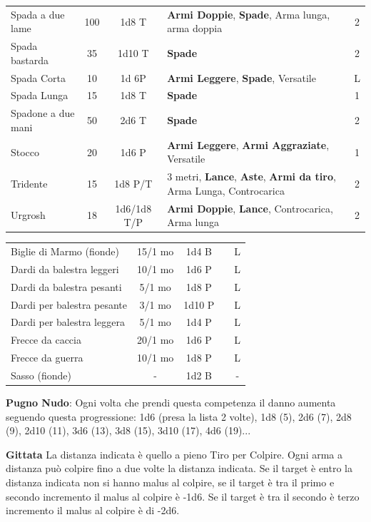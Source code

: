 \documentclass[a4paper,11pt,twoside,openany]{book}
\begin{document}
\begin{tabularx}{0.95\textwidth}{lccXc}
	Spada a due lame& 100& 1d8 T& \textbf{Armi Doppie}, \textbf{Spade}, Arma lunga, arma doppia& 2\\
	Spada bastarda& 35 & 1d10 T&\textbf{Spade}& 2\\
	Spada Corta& 10 & 1d 6P&\textbf{Armi Leggere}, \textbf{Spade}, Versatile& L\\
	Spada Lunga& 15 & 1d8 T&\textbf{Spade}& 1\\
	Spadone a due mani& 50 & 2d6 T&\textbf{Spade}& 2\\
	Stocco& 20 & 1d6 P& \textbf{Armi Leggere}, \textbf{Armi Aggraziate}, Versatile& 1\\
	Tridente& 15 & 1d8 P/T& 3 metri, \textbf{Lance}, \textbf{Aste}, \textbf{Armi da tiro}, Arma Lunga, Controcarica& 2\\
	Urgrosh& 18 & 1d6/1d8 T/P& \textbf{Armi Doppie}, \textbf{Lance}, Controcarica, Arma lunga & 2\\
\end{tabularx}

\bigskip

\begin{tabularx}{0.95\textwidth}{lccXc}	
	Biglie di Marmo (fionde)& 15/1 mo & 1d4 B & & L\\
	Dardi da balestra leggeri & 10/1 mo & 1d6 P & & L\\
	Dardi da balestra pesanti & 5/1 mo & 1d8 P & & L\\
	Dardi per balestra pesante & 3/1 mo & 1d10 P & & L\\
	Dardi per balestra leggera & 5/1 mo & 1d4 P & & L\\
	Frecce da caccia& 20/1 mo & 1d6 P& &L\\
	Frecce da guerra& 10/1 mo & 1d8 P& &L\\
	Sasso (fionde)& -& 1d2 B& &-\\
\end{tabularx}

\medskip

\textbf{Pugno Nudo}: Ogni volta che prendi questa competenza il danno aumenta seguendo questa progressione: 1d6 (presa la lista 2 volte), 1d8 (5), 2d6 (7), 2d8 (9), 2d10 (11), 3d6 (13), 3d8 (15), 3d10 (17), 4d6 (19)...

\bigskip

\textbf{Gittata}
La distanza indicata è quello a pieno Tiro per Colpire. Ogni arma a distanza può colpire  fino a due volte la distanza indicata. Se il target è entro la distanza indicata non si hanno malus al colpire, se il target è tra il primo e secondo incremento il malus al colpire è -1d6. Se il target è tra il secondo è terzo incremento il malus al colpire è di -2d6.
\end{document}
